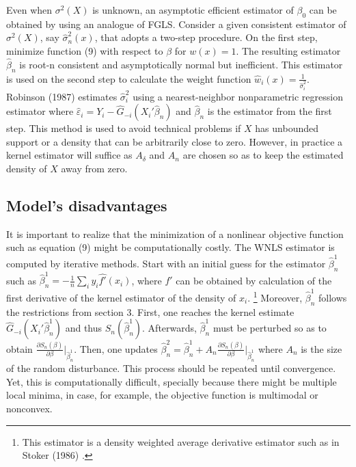 Even when $\sigma^2(X)$ is unknown, an asymptotic efficient estimator of $\beta_0$ can be obtained by using an analogue of FGLS.  Consider a given consistent estimator of $\sigma^2(X)$, say $\hat{\sigma}_{n}^{2}(x)$, that adopts a two-step procedure. On the first step, minimize function (9) with respect to $\beta$ for $w(x) = 1$. The resulting estimator $\hat{\beta}_n$ is root-n consistent and asymptotically normal but inefficient. This estimator is used on the second step to calculate the weight function $\hat{w}_i(x) = \frac{1}{\hat{\sigma}_{i}^{2}}$. Robinson (1987) \cite{[20]} estimates $\hat{\sigma}_{i}^{2}$ using a nearest-neighbor nonparametric regression estimator
where $\hat{\varepsilon}_i = Y_i - \hat{G}_{-i}(X_i'\hat{\beta}_n)$ and $\hat{\beta}_n$ is the estimator from the first step. This method is used to avoid technical problems if $X$ has unbounded support or a density that can be arbitrarily close to zero. However, in practice a kernel estimator will suffice as $A_\delta$ and $A_n$ are chosen so as to keep the estimated density of $X$ away from zero.




\subsection{Model's disadvantages} %
\label{sub:Model's disadvantages}


It is important to realize that the minimization of a nonlinear objective function such as equation (9) might be computationally costly. The WNLS estimator is computed by iterative methods. Start with an initial guess for the estimator $\hat{\beta}_n^{1}$ such as $\hat{\beta}_n^{1} = - \frac{1}{n}\sum_i y_i\hat{f'}(x_i)$, where $f'$ can be obtained by calculation of the first derivative of the kernel estimator of the density of $x_i$. \footnote{This estimator is a density weighted average derivative estimator such as in Stoker (1986) \cite{[21]}.} Moreover, $\hat{\beta}_n^{1}$ follows the restrictions from section 3. First, one reaches the kernel estimate $\hat{G}_{-i}(X_i'\hat{\beta}_n^{1})$ and thus $S_n(\hat{\beta}_n^{1})$. Afterwards, $\hat{\beta}_n^{1}$ must be perturbed so as to obtain $\frac{\partial S_n(\beta)}{\partial\beta} |_{\hat{\beta}_n^{1}}$. Then, one updates $\hat{\beta}_n^{2} = \hat{\beta}_n^{1} + A_n  \frac{ \partial S_n(\beta)}{\partial\beta}|_{\hat{\beta}_n^{1}}$ where $A_n$ is the size of the random disturbance. This process should be repeated until convergence. Yet, this is computationally difficult, specially because there might be multiple local minima, in case, for example, the objective function is multimodal or nonconvex. 

